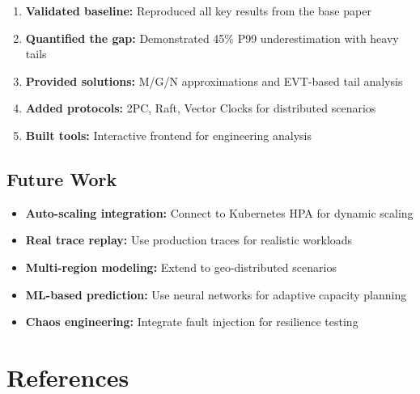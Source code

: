 \documentclass[11pt,a4paper]{article}
\begin{document}
\begin{enumerate}
    \item \textbf{Validated baseline:} Reproduced all key results from the base paper
    \item \textbf{Quantified the gap:} Demonstrated 45\% P99 underestimation with heavy tails
    \item \textbf{Provided solutions:} M/G/N approximations and EVT-based tail analysis
    \item \textbf{Added protocols:} 2PC, Raft, Vector Clocks for distributed scenarios
    \item \textbf{Built tools:} Interactive frontend for engineering analysis
\end{enumerate}

\subsection{Future Work}

\begin{itemize}
    \item \textbf{Auto-scaling integration:} Connect to Kubernetes HPA for dynamic scaling
    \item \textbf{Real trace replay:} Use production traces for realistic workloads
    \item \textbf{Multi-region modeling:} Extend to geo-distributed scenarios
    \item \textbf{ML-based prediction:} Use neural networks for adaptive capacity planning
    \item \textbf{Chaos engineering:} Integrate fault injection for resilience testing
\end{itemize}


\section{References}
\end{document}
